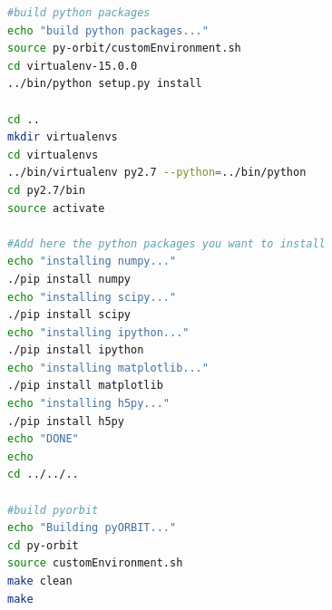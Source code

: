 \documentclass[a4paper]{cernatsnote}
\begin{document}
\begin{lstlisting}[language=bash, belowskip=-3\medskipamount]
#build python packages
echo "build python packages..."
source py-orbit/customEnvironment.sh
cd virtualenv-15.0.0
../bin/python setup.py install

cd ..
mkdir virtualenvs
cd virtualenvs
../bin/virtualenv py2.7 --python=../bin/python
cd py2.7/bin
source activate

#Add here the python packages you want to install
echo "installing numpy..."
./pip install numpy
echo "installing scipy..."
./pip install scipy
echo "installing ipython..."
./pip install ipython
echo "installing matplotlib..."
./pip install matplotlib
echo "installing h5py..."
./pip install h5py
echo "DONE"
echo
cd ../../..

#build pyorbit
echo "Building pyORBIT..."
cd py-orbit
source customEnvironment.sh
make clean
make
\end{lstlisting}
	
	\newpage
\end{document}
